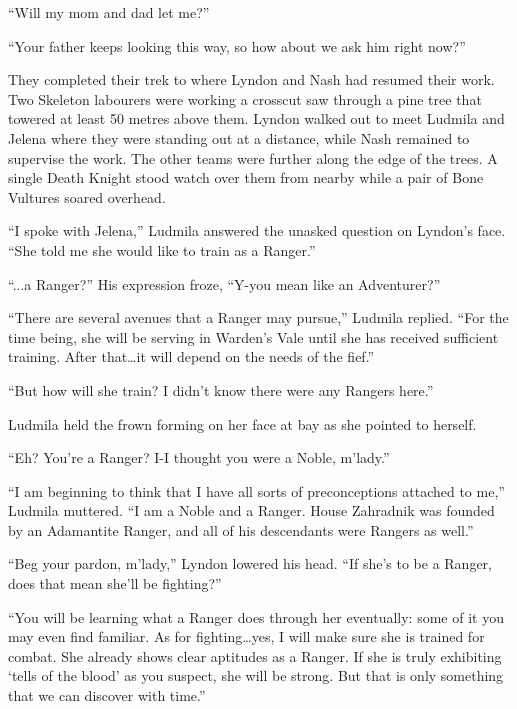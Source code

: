  

“Will my mom and dad let me?”

 

“Your father keeps looking this way, so how about we ask him right now?”

 

They completed their trek to where Lyndon and Nash had resumed their work. Two Skeleton labourers were working a crosscut saw through a pine tree that towered at least 50 metres above them. Lyndon walked out to meet Ludmila and Jelena where they were standing out at a distance, while Nash remained to supervise the work. The other teams were further along the edge of the trees. A single Death Knight stood watch over them from nearby while a pair of Bone Vultures soared overhead.

 

“I spoke with Jelena,” Ludmila answered the unasked question on Lyndon’s face. “She told me she would like to train as a Ranger.”

 

“...a Ranger?” His expression froze, “Y-you mean like an Adventurer?”

 

“There are several avenues that a Ranger may pursue,” Ludmila replied. “For the time being, she will be serving in Warden’s Vale until she has received sufficient training. After that…it will depend on the needs of the fief.”

 

“But how will she train? I didn’t know there were any Rangers here.”

 

Ludmila held the frown forming on her face at bay as she pointed to herself.

 

“Eh? You’re a Ranger? I-I thought you were a Noble, m’lady.”

 

“I am beginning to think that I have all sorts of preconceptions attached to me,” Ludmila muttered. “I am a Noble and a Ranger. House Zahradnik was founded by an Adamantite Ranger, and all of his descendants were Rangers as well.”

 

“Beg your pardon, m’lady,” Lyndon lowered his head. “If she’s to be a Ranger, does that mean she’ll be fighting?”

 

“You will be learning what a Ranger does through her eventually: some of it you may even find familiar. As for fighting…yes, I will make sure she is trained for combat. She already shows clear aptitudes as a Ranger. If she is truly exhibiting ‘tells of the blood’ as you suspect, she will be strong. But that is only something that we can discover with time.”

